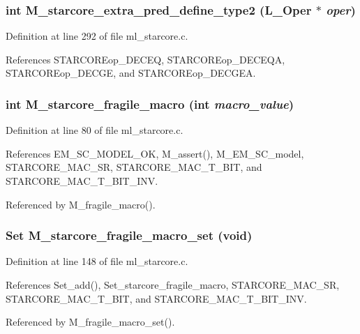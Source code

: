 \subsubsection{\setlength{\rightskip}{0pt plus 5cm}int M\_\-starcore\_\-extra\_\-pred\_\-define\_\-type2 (L\_\-Oper $\ast$ {\em oper})}\label{ml__starcore_8c_d853c01609fc58afaf01e6828c455f7d}




Definition at line 292 of file ml\_\-starcore.c.

References STARCOREop\_\-DECEQ, STARCOREop\_\-DECEQA, STARCOREop\_\-DECGE, and STARCOREop\_\-DECGEA.
\subsubsection{\setlength{\rightskip}{0pt plus 5cm}int M\_\-starcore\_\-fragile\_\-macro (int {\em macro\_\-value})}\label{ml__starcore_8c_747818cff5bc21edfaf0ced9c55aecd3}




Definition at line 80 of file ml\_\-starcore.c.

References EM\_\-SC\_\-MODEL\_\-OK, M\_\-assert(), M\_\-EM\_\-SC\_\-model, STARCORE\_\-MAC\_\-SR, STARCORE\_\-MAC\_\-T\_\-BIT, and STARCORE\_\-MAC\_\-T\_\-BIT\_\-INV.

Referenced by M\_\-fragile\_\-macro().
\subsubsection{\setlength{\rightskip}{0pt plus 5cm}\bf{Set} M\_\-starcore\_\-fragile\_\-macro\_\-set (void)}\label{ml__starcore_8c_57e8ea31a47d0989ad0afac092100a5f}




Definition at line 148 of file ml\_\-starcore.c.

References Set\_\-add(), Set\_\-starcore\_\-fragile\_\-macro, STARCORE\_\-MAC\_\-SR, STARCORE\_\-MAC\_\-T\_\-BIT, and STARCORE\_\-MAC\_\-T\_\-BIT\_\-INV.

Referenced by M\_\-fragile\_\-macro\_\-set().
